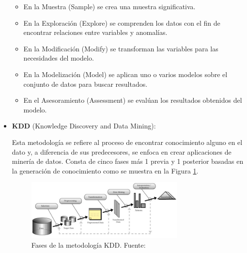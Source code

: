 \begin{itemize}
	\begin{itemize}
		\item En la Muestra (Sample) se crea una muestra significativa.
		\item En la Exploración (Explore) se comprenden los datos con el fin de encontrar relaciones entre variables y anomalías.
		\item En la Modificación (Modify) se transforman las variables para las necesidades del modelo.
		\item En la Modelización (Model) se aplican uno o varios modelos sobre el conjunto de datos para buscar resultados.
		\item En el Asesoramiento (Assessment) se evalúan los resultados obtenidos del modelo.
	\end{itemize}
	
	\item \textbf{KDD} (Knowledge Discovery and Data Mining):
	
	Esta metodología se refiere al proceso de encontrar conocimiento alguno en el dato y, a diferencia de sus predecesores, se enfoca en crear aplicaciones de minería de datos. Consta de cinco fases más 1 previa y 1 posterior basadas en la generación de conocimiento como se muestra en la Figura \ref{2:fig10}.
	\begin{figure}[h]
		\begin{center}
			\includegraphics[width=0.75\textwidth]{2/figures/kdd.jpg}
			\caption{Fases de la metodología KDD. Fuente: \cite{tec_braulio2015metodologiasdm}}
			\label{2:fig10}
		\end{center}
	\end{figure}
	

\end{itemize}
